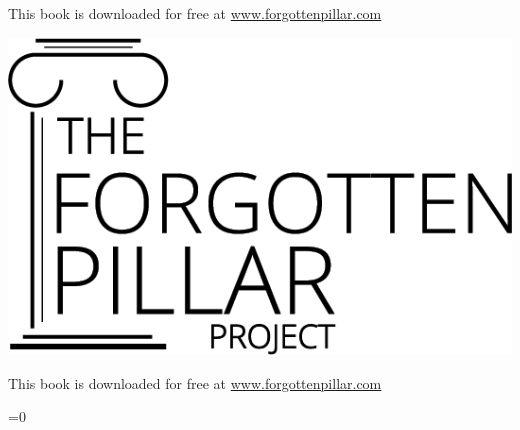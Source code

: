 {    This book is downloaded for free at \href{https://forgottenpillar.com/book/the-forgotten-pillar}{www.forgottenpillar.com}
\else
    \noindent
    \begin{minipage}{0.3\textwidth}
        \includegraphics[width=\linewidth]{images/logo-black.png}
    \end{minipage}%
    \hfill
    \begin{minipage}{\dimexpr\linewidth-0.3\textwidth-0.125\textwidth-1em\relax}
        \raggedleft\footnotesize
        This book is downloaded for free at \href{https://forgottenpillar.com/book/the-forgotten-pillar?lang=\currentlang&type=\currentlayout}{www.forgottenpillar.com}
    \end{minipage}%
    \ifnum{}=0
    \else
        \hfill
        \begin{minipage}{0.125\textwidth}
            \centering
        \end{minipage}
    \fi%
\fi
}

\pagebreak
